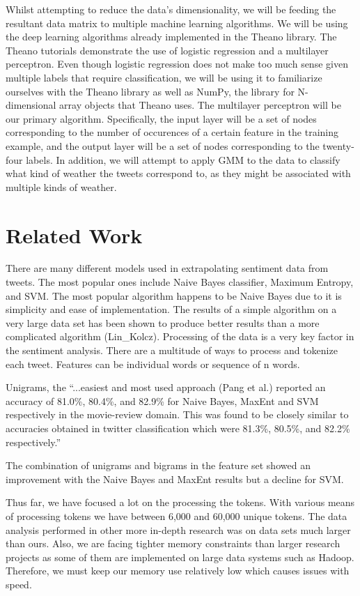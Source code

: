 \documentclass{article}
\begin{document}



Whilst attempting to reduce the data's dimensionality, we will be feeding the resultant data matrix to multiple machine learning algorithms. We will be using the deep learning algorithms already implemented in the Theano library. The Theano tutorials demonstrate the use of logistic regression and a multilayer perceptron. Even though logistic regression does not make too much sense given multiple labels that require classification, we will be using it to familiarize ourselves with the Theano library as well as NumPy, the library for N-dimensional array objects that Theano uses. The multilayer perceptron will be our primary algorithm. Specifically, the input layer will be a set of nodes corresponding to the number of occurences of a certain feature in the training example, and the output layer will be a set of nodes corresponding to the twenty-four labels. In addition, we will attempt to apply GMM to the data to classify what kind of weather the tweets correspond to, as they might be associated with multiple kinds of weather.

\section{Related Work}
There are many different models used in extrapolating sentiment data from tweets. The most popular ones include Naive Bayes classifier, Maximum Entropy, and SVM. The most popular algorithm happens to be Naive Bayes due to it is simplicity and ease of implementation. The results of a simple algorithm on a very large data set has been shown to produce better results than a more complicated algorithm (Lin\_Kolcz). Processing of the data is a very key factor in the sentiment analysis. There are a multitude of ways to process and tokenize each tweet. Features can be individual words or sequence of n words.

Unigrams, the ``...easiest and most used approach (Pang et al.) reported an accuracy of 81.0\%, 80.4\%, and 82.9\% for Naive Bayes, MaxEnt and SVM respectively in the movie-review domain. This was found to be closely similar to accuracies obtained in twitter classification which were 81.3\%, 80.5\%, and 82.2\% respectively.''

The combination of unigrams and bigrams in the feature set showed an improvement with the Naive Bayes and MaxEnt results but a decline for SVM.

Thus far, we have focused a lot on the processing the tokens. With various means of processing tokens we have between 6,000 and 60,000 unique tokens. The data analysis performed in other more in-depth research was on data sets much larger than ours. Also, we are facing tighter memory constraints than larger research projects as some of them are implemented on large data systems such as Hadoop. Therefore, we must keep our memory use relatively low which causes issues with speed.
\end{document}
